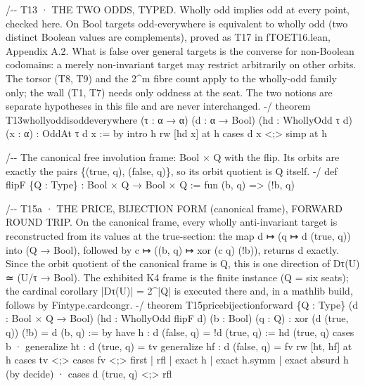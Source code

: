 \documentclass[10pt]{article}
\renewcommand{\_}{\origunderscore\allowbreak}
\newenvironment{Shaded}{}{}
\newcommand{\NormalTok}[1]{#1}
\begin{document}
\begin{Shaded}
\begin{Highlighting}[]
\NormalTok{/{-}{-} T13 · THE TWO ODDS, TYPED. Wholly odd implies odd at every point,}
\NormalTok{    checked here. On Bool targets odd{-}everywhere is equivalent to wholly}
\NormalTok{    odd (two distinct Boolean values are complements), proved as T17 in}
\NormalTok{    fTOE\_T16.lean, Appendix A.2. What is false over general targets}
\NormalTok{    is the converse for non{-}Boolean codomains: a merely non{-}invariant}
\NormalTok{    target may restrict arbitrarily on other orbits. The torsor (T8, T9)}
\NormalTok{    and the 2\^{}m fibre count apply to the wholly{-}odd family only; the wall}
\NormalTok{    (T1, T7) needs only oddness at the seat. The two notions are separate}
\NormalTok{    hypotheses in this file and are never interchanged. {-}/}
\NormalTok{theorem T13\_wholly\_odd\_is\_odd\_everywhere (τ : α → α) (d : α → Bool)}
\NormalTok{    (hd : WhollyOdd τ d) (x : α) : OddAt τ d x := by}
\NormalTok{  intro h}
\NormalTok{  rw [hd x] at h}
\NormalTok{  cases d x \textless{};\textgreater{} simp at h}

\NormalTok{/{-}{-} The canonical free involution frame: Bool × Q with the flip.}
\NormalTok{    Its orbits are exactly the pairs \{(true, q), (false, q)\}, so its}
\NormalTok{    orbit quotient is Q itself. {-}/}
\NormalTok{def flipF \{Q : Type\} : Bool × Q → Bool × Q := fun (b, q) =\textgreater{} (!b, q)}

\NormalTok{/{-}{-} T15a · THE PRICE, BIJECTION FORM (canonical frame), FORWARD ROUND TRIP.}
\NormalTok{    On the canonical frame, every wholly anti{-}invariant target is}
\NormalTok{    reconstructed from its values at the true{-}section: the map}
\NormalTok{    d ↦ (q ↦ d (true, q)) into (Q → Bool), followed by}
\NormalTok{    c ↦ ((b, q) ↦ xor (c q) (!b)), returns d exactly. Since the orbit}
\NormalTok{    quotient of the canonical frame is Q, this is one direction of}
\NormalTok{    Dτ(U) ≃ (U/τ → Bool). The exhibited K4 frame is the finite instance}
\NormalTok{    (Q = six seats); the cardinal corollary |Dτ(U)| = 2\^{}|Q| is executed}
\NormalTok{    there and, in a mathlib build, follows by Fintype.card\_congr. {-}/}
\NormalTok{theorem T15\_price\_bijection\_forward \{Q : Type\} (d : Bool × Q → Bool)}
\NormalTok{    (hd : WhollyOdd flipF d) (b : Bool) (q : Q) :}
\NormalTok{    xor (d (true, q)) (!b) = d (b, q) := by}
\NormalTok{  have h : d (false, q) = !d (true, q) := hd (true, q)}
\NormalTok{  cases b}
\NormalTok{  · generalize ht : d (true, q) = tv}
\NormalTok{    generalize hf : d (false, q) = fv}
\NormalTok{    rw [ht, hf] at h}
\NormalTok{    cases tv \textless{};\textgreater{} cases fv \textless{};\textgreater{}}
\NormalTok{      first | rfl | exact h | exact h.symm | exact absurd h (by decide)}
\NormalTok{  · cases d (true, q) \textless{};\textgreater{} rfl}


\end{Highlighting}
\end{Shaded}
\end{document}
